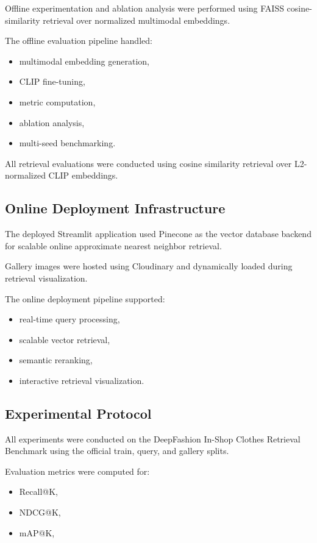 \documentclass[11pt,a4paper]{article}
\begin{document}
Offline experimentation and ablation analysis were performed using FAISS cosine-similarity retrieval over normalized multimodal embeddings.

The offline evaluation pipeline handled:
\begin{itemize}
    \item multimodal embedding generation,
    \item CLIP fine-tuning,
    \item metric computation,
    \item ablation analysis,
    \item multi-seed benchmarking.
\end{itemize}

All retrieval evaluations were conducted using cosine similarity retrieval over L2-normalized CLIP embeddings.

\subsection{Online Deployment Infrastructure}

The deployed Streamlit application used Pinecone as the vector database backend for scalable online approximate nearest neighbor retrieval.

Gallery images were hosted using Cloudinary and dynamically loaded during retrieval visualization.

The online deployment pipeline supported:
\begin{itemize}
    \item real-time query processing,
    \item scalable vector retrieval,
    \item semantic reranking,
    \item interactive retrieval visualization.
\end{itemize}

\subsection{Experimental Protocol}

All experiments were conducted on the DeepFashion In-Shop Clothes Retrieval Benchmark using the official train, query, and gallery splits.

Evaluation metrics were computed for:
\begin{itemize}
    \item Recall@K,
    \item NDCG@K,
    \item mAP@K,
\end{itemize}
\end{document}
